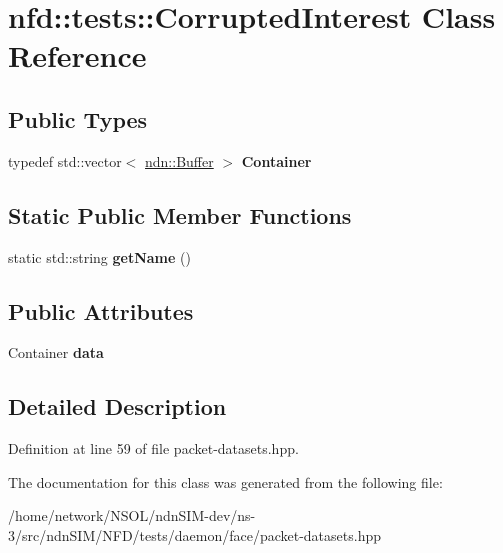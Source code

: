 \hypertarget{classnfd_1_1tests_1_1CorruptedInterest}{}\section{nfd\+:\+:tests\+:\+:Corrupted\+Interest Class Reference}
\label{classnfd_1_1tests_1_1CorruptedInterest}
\subsection*{Public Types}
\begin{DoxyCompactItemize}
\item 
typedef std\+::vector$<$ \hyperlink{classndn_1_1Buffer}{ndn\+::\+Buffer} $>$ {\bfseries Container}\hypertarget{classnfd_1_1tests_1_1CorruptedInterest_a059aa45dcef3e51471d4922d094bae68}{}\label{classnfd_1_1tests_1_1CorruptedInterest_a059aa45dcef3e51471d4922d094bae68}

\end{DoxyCompactItemize}
\subsection*{Static Public Member Functions}
\begin{DoxyCompactItemize}
\item 
static std\+::string {\bfseries get\+Name} ()\hypertarget{classnfd_1_1tests_1_1CorruptedInterest_ac859b5190653ed54b7da4bbfff30ec0b}{}\label{classnfd_1_1tests_1_1CorruptedInterest_ac859b5190653ed54b7da4bbfff30ec0b}

\end{DoxyCompactItemize}
\subsection*{Public Attributes}
\begin{DoxyCompactItemize}
\item 
Container {\bfseries data}\hypertarget{classnfd_1_1tests_1_1CorruptedInterest_a15f8ecccde0a9eb17cadb0a33b0c9629}{}\label{classnfd_1_1tests_1_1CorruptedInterest_a15f8ecccde0a9eb17cadb0a33b0c9629}

\end{DoxyCompactItemize}


\subsection{Detailed Description}


Definition at line 59 of file packet-\/datasets.\+hpp.



The documentation for this class was generated from the following file\+:\begin{DoxyCompactItemize}
\item 
/home/network/\+N\+S\+O\+L/ndn\+S\+I\+M-\/dev/ns-\/3/src/ndn\+S\+I\+M/\+N\+F\+D/tests/daemon/face/packet-\/datasets.\+hpp\end{DoxyCompactItemize}
